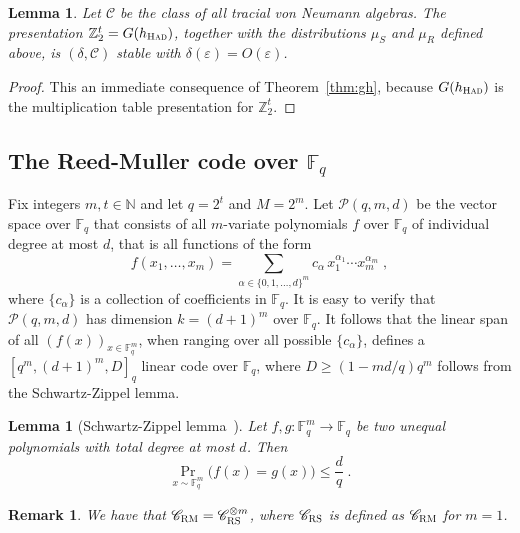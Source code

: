 \documentclass[11pt]{article}
\newtheorem{lemma}[theorem]{Lemma}
\newtheorem{remark}[theorem]{Remark}
\theoremstyle{definition}
\newcommand{\code}{\mathscr{C}}
\newcommand{\N}{\ensuremath{\mathbb{N}}}
\newcommand{\F}{\ensuremath{\mathbb{F}}}
\newcommand{\Z}{\ensuremath{\mathbb{Z}}}
\newcommand{\mC}{\ensuremath{\mathcal{C}}}
\newcommand{\mP}{\ensuremath{\mathcal{P}}}
\newcommand{\RM}{\ensuremath{\textsc{RM}}}
\newcommand{\RS}{\ensuremath{\textsc{RS}}}
\newcommand{\had}{\textsc{Had}}
\newcommand{\eps}{\varepsilon}
\begin{document}
\begin{lemma}\label{lem:had-stab}
Let $\mC$ be the class of all tracial von Neumann algebras. 
The presentation $\Z_2^t= G(h_\had)$, together with the distributions $\mu_S$ and $\mu_R$ defined above, is $(\delta,\mC)$ stable with $\delta(\eps)=O(\eps)$. 
\end{lemma}

\begin{proof}
This an immediate consequence of Theorem~\ref{thm:gh}, because $G(h_\had)$ is the multiplication table presentation for $\Z_2^t$.
\end{proof}



\subsection{The Reed-Muller code over $\F_q$}
\label{sec:rmq}

Fix integers $m,t \in \N$ and let $q=2^t$ and $M = 2^m$. Let $\mP(q,m,d)$ be the vector space over $\F_q$ that consists of all $m$-variate polynomials $f$ over $\F_q$ of individual degree at most $d$, that is all functions of the form
\[
	f(x_1,\ldots,x_m) = \sum_{\alpha \in \{0,1,\ldots,d\}^m} c_\alpha\,
  x_1^{\alpha_1} \cdots x_m^{\alpha_m}\;,
\]
where $\{c_\alpha\}$ is a collection of coefficients in $\F_q$. It is easy to verify that $\mP(q,m,d)$ has dimension $k = (d+1)^m$ over $\F_q$. It follows that the linear span of all $(f(x))_{x\in \F_q^m}$, when ranging over all possible $\{c_\alpha\}$, defines a $[q^m,(d+1)^m,D]_q$ linear code over $\F_q$, where $D\geq (1-md/q)q^m$ follows from the Schwartz-Zippel lemma.

\begin{lemma}[Schwartz-Zippel lemma~\cite{Sch80,Zip79}]
  \label{lem:schwartz-zippel}
  Let $f, g: \F_q^m \to \F_q$ be two unequal polynomials with total degree at most $d$. Then
  \begin{equation*}
    \Pr_{x \sim \F_q^m}\big(f(x) = g(x)\big) \leq \frac{d}{q}\;.
  \end{equation*}
\end{lemma}

\begin{remark}\label{rk:tensor-code}
We have that $\code_\RM = \code_\RS^{\otimes m}$, where $\code_\RS$ is defined as $\code_\RM$ for $m=1$.
\end{remark}
\end{document}
